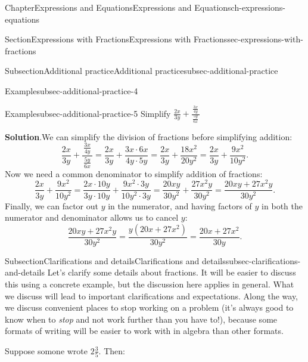 \documentclass[twoside,11pt,]{book}
\newcommand{\blocktitlefont}{\relax}
\numberwithin{equation}{chapter}
\begin{document}
\begin{chapterptx}{Chapter}{Expressions and Equations}{}{Expressions and Equations}{}{}{ch-expressions-equations}
\begin{sectionptx}{Section}{Expressions with Fractions}{}{Expressions with Fractions}{}{}{sec-expressions-with-fractions}
\begin{subsectionptx}{Subsection}{Additional practice}{}{Additional practice}{}{}{subsec-additional-practice}
\begin{example}{Example}{}{subsec-additional-practice-4}
\end{example}
\begin{example}{Example}{}{subsec-additional-practice-5}%
Simplify \(\frac{2x}{3y} + \frac{\,\frac{3x}{4y}\,}{\,\frac{5y}{6x}\,}\)%
\par\smallskip%
\noindent\textbf{\blocktitlefont Solution}.\hypertarget{subsec-additional-practice-5-2}{}\quad{}We can simplify the division of fractions before simplifying addition:%
\begin{equation*}
\frac{2x}{3y} + \frac{\,\frac{3x}{4y}\,}{\,\frac{5y}{6x}\,} = \frac{2x}{3y} + \frac{3x \cdot 6x}{4y \cdot 5y} = \frac{2x}{3y} + \frac{18x^2}{20y^2} = \frac{2x}{3y} + \frac{9x^2}{10y^2}.
\end{equation*}
Now we need a common denominator to simplify addition of fractions:%
\begin{equation*}
\frac{2x}{3y} + \frac{9x^2}{10y^2} = \frac{2x \cdot 10y}{3y \cdot 10y} + \frac{9x^2 \cdot 3y}{10y^2 \cdot 3y} = \frac{20xy}{30y^2} + \frac{27x^2y}{30y^2} = \frac{20xy + 27x^2y}{30y^2}.
\end{equation*}
Finally, we can factor out \(y\) in the numerator, and having factors of \(y\) in both the numerator and denominator allows us to cancel \(y\):%
\begin{equation*}
\frac{20xy + 27x^2y}{30y^2} = \frac{y(20x + 27x^2)}{30y^2} = \frac{20x + 27x^2}{30y}.
\end{equation*}
%
\end{example}
\end{subsectionptx}
%
%
\typeout{************************************************}
\typeout{************************************************}
%
\begin{subsectionptx}{Subsection}{Clarifications and details}{}{Clarifications and details}{}{}{subsec-clarifications-and-details}
Let's clarify some details about fractions. It will be easier to discuss this using a concrete example, but the discussion here applies in general. What we discuss will lead to important clarifications and expectations. Along the way, we discuss convenient places to stop working on a problem (it's always good to know when to \emph{stop} and not work further than you have to!), because some formats of writing will be easier to work with in algebra than other formats.%
\par
Suppose somone wrote \(2 \frac{3}{5}\). Then:%
\begin{itemize}[label=\textbullet]

\end{itemize}
\end{subsectionptx}
\end{sectionptx}
\end{chapterptx}
\end{document}
